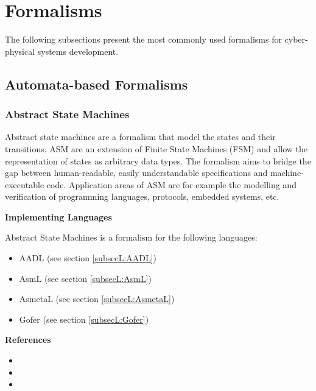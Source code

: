 \section{Formalisms}
\label{sec:formalisms}

The following subsections present the most commonly used formalisms for cyber-physical systems development.

\subsection{Automata-based Formalisms}

\subsubsection{Abstract State Machines}
\label{subsecF:AbstractStateMachines}


Abstract state machines are a formalism that model the states and their transitions.
ASM are an extension of Finite State Machines (FSM) and allow the representation of states as arbitrary data types. The formalism aims to bridge the gap between human-readable, easily understandable specifications and machine-executable code.
Application areas of ASM are for example the modelling and verification of programming languages, protocols, embedded systems, etc.

\textbf{Implementing Languages}

Abstract State Machines is a formalism for the following languages:
\begin{itemize}
	\item AADL (see section \ref{subsecL:AADL})
	\item AsmL (see section \ref{subsecL:AsmL})
	\item AsmetaL (see section \ref{subsecL:AsmetaL})
	\item Gofer (see section \ref{subsecL:Gofer})
\end{itemize}





\textbf{References}
\begin{itemize}
	
\item {}
	
\item {}
	
\item {}
\end{itemize}



